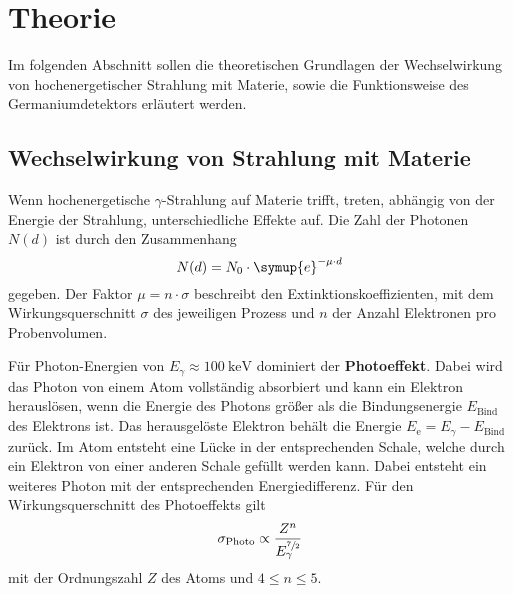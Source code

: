 \section{Theorie}
\label{sec:theorie}

Im folgenden Abschnitt sollen die theoretischen Grundlagen der Wechselwirkung von hochenergetischer Strahlung mit Materie,
sowie die Funktionsweise des Germaniumdetektors erläutert werden.

\subsection{Wechselwirkung von Strahlung mit Materie}
\label{sec:wechselwirkungen}

Wenn hochenergetische $\gamma$-Strahlung auf Materie trifft,
treten,
abhängig von der Energie der Strahlung,
unterschiedliche Effekte auf.
Die Zahl der Photonen $N(d)$ ist durch den Zusammenhang
\begin{equation}
    N(d) = N_0 \cdot \symup{e}^{-\mu \cdot d}
\end{equation}
gegeben.
Der Faktor $\mu = n \cdot \sigma$ beschreibt den Extinktionskoeffizienten,
mit dem Wirkungsquerschnitt $\sigma$ des jeweiligen Prozess und $n$ der Anzahl Elektronen pro Probenvolumen.

Für Photon-Energien von $E_{\gamma} \approx \SI{100}{\kilo\eV}$ dominiert der \textbf{Photoeffekt}.
Dabei wird das Photon von einem Atom vollständig absorbiert und kann ein Elektron herauslösen,
wenn die Energie des Photons größer als die Bindungsenergie $E_\text{Bind}$ des Elektrons ist.
Das herausgelöste Elektron behält die Energie $E_\text{e} = E_{\gamma} - E_\text{Bind}$ zurück.
Im Atom entsteht eine Lücke in der entsprechenden Schale,
welche durch ein Elektron von einer anderen Schale gefüllt werden kann.
Dabei entsteht ein weiteres Photon mit der entsprechenden Energiedifferenz.
Für den Wirkungsquerschnitt des Photoeffekts gilt
\begin{equation*}
    \sigma_\text{Photo} \propto \frac{Z^n}{E^{\sfrac{7}{2}}_{\gamma}}
\end{equation*}
mit der Ordnungszahl $Z$ des Atoms und $4 \leq n \leq \num{5}$.

